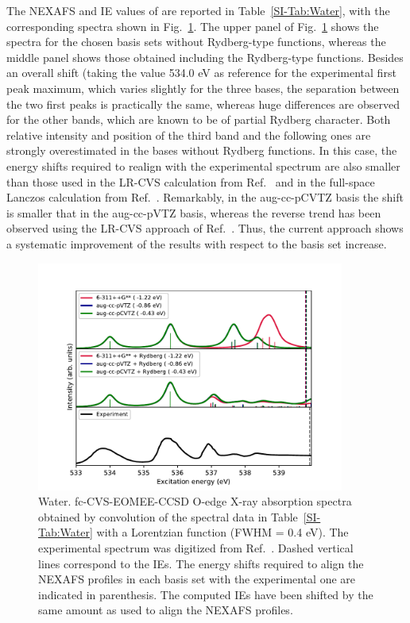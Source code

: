 \documentclass[journal=jctcce,manuscript=article]{achemso}
\begin{document}
The NEXAFS and IE values of  are reported in Table~\ref{SI-Tab:Water}, with the corresponding spectra shown in Fig.~\ref{fgr:water}. The upper panel of Fig.~\ref{fgr:water} shows the spectra for the chosen basis sets without Rydberg-type functions, whereas the middle panel shows those obtained including the Rydberg-type functions.
Besides an overall shift (taking the value 534.0 eV as reference for the experimental first peak maximum, which varies slightly for the three bases, the separation between the two first peaks is practically the same, whereas huge differences are observed for the other bands, which are known to be of partial Rydberg character.
Both relative intensity and position of the third band and the following ones are strongly overestimated in the bases without Rydberg functions. 
In this case, the energy shifts required to realign with the experimental spectrum are also smaller than those used in 
the LR-CVS calculation from Ref.~  and in the full-space Lanczos calculation from Ref.~.
Remarkably, in the aug-cc-pCVTZ basis the shift is smaller that in the aug-cc-pVTZ basis, whereas the reverse trend has been observed using the LR-CVS approach of Ref.~. Thus, the current approach shows a systematic improvement of the results with respect to the basis set increase.

\begin{figure}[H]
  \includegraphics[width=0.9\textwidth]{Spectra/H2O.pdf}
  \caption{Water. fc-CVS-EOMEE-CCSD O-edge X-ray absorption spectra  obtained by convolution of the spectral data in Table~\ref{SI-Tab:Water} with a Lorentzian function (FWHM = 0.4 eV). The experimental spectrum was digitized from Ref.~. \label{fgr:water}
Dashed vertical lines correspond to the IEs. The energy shifts 
required to align the NEXAFS profiles in each basis set with the
experimental one are indicated in parenthesis.
The computed IEs have been shifted by the same amount as used to align the NEXAFS profiles.}
\end{figure}
\end{document}
